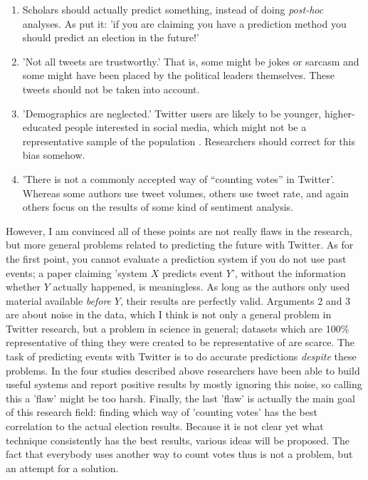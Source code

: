 \documentclass[12pt]{article}
\begin{document}
\begin{enumerate}
\item Scholars should actually predict something, instead of doing \emph{post-hoc} analyses. As  put it: 'if you are claiming you have a prediction method you should predict an election in the future!'
\item 'Not all tweets are trustworthy.' That is, some might be jokes or sarcasm and some might have been placed by the political leaders themselves. These tweets should not be taken into account.
\item 'Demographics are neglected.' Twitter users are likely to be younger, higher-educated people interested in social media, which might not be a representative sample of the population . Researchers should correct for this bias somehow.
\item 'There is not a commonly accepted way of “counting votes” in Twitter'. Whereas some authors use tweet volumes, others use tweet rate, and again others focus on the results of some kind of sentiment analysis.
\end{enumerate}

However, I am convinced all of these points are not really flaws in the research, but more general problems related to predicting the future with Twitter. As for the first point, you cannot evaluate a prediction system if you do not use past events; a paper claiming 'system $X$ predicts event $Y$', without the information whether $Y$ actually happened, is meaningless. As long as the authors only used material available \emph{before} $Y$, their results are perfectly valid. Arguments 2 and 3 are about noise in the data, which I think is not only a general problem in Twitter research, but a problem in science in general; datasets which are 100\% representative of thing they were created to be representative of are scarce. The task of predicting events with Twitter is to do accurate predictions \emph{despite} these problems. In the four studies described above researchers have been able to build useful systems and report positive results by mostly ignoring this noise, so calling this a 'flaw' might be too harsh. Finally, the last 'flaw' is actually the main goal of this research field: finding which way of 'counting votes' has the best correlation to the actual election results. Because it is not clear yet what technique consistently has the best results, various ideas will be proposed. The fact that everybody uses another way to count votes thus is not a problem, but an attempt for a solution.
\end{document}
